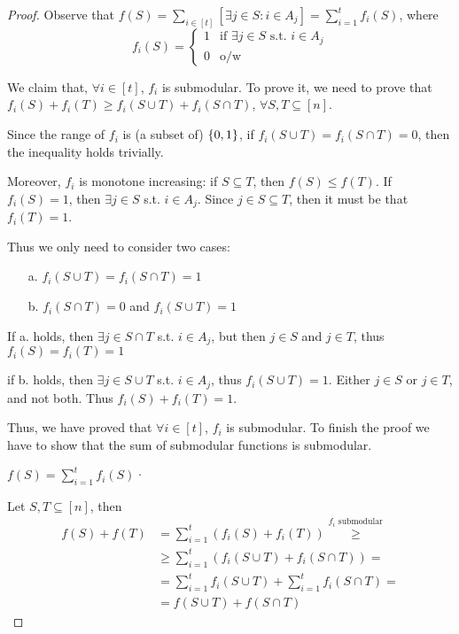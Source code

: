     \begin{proof}
        Observe that $f(S) = \sum_{i \in [t]} [\exists j \in S : i \in A_j] = \sum_{i=1}^{t} f_i(S)$, where
        \begin{equation}
            f_i(S) =
            \begin{cases}
                1 & \text{if } \exists j \in S \text{ s.t. } i \in A_j\\
                0 & \text{o/w}
            \end{cases}
        \end{equation}

        We claim that, $\forall i \in [t]$, $f_i$ is submodular.
        To prove it, we need to prove that $f_i(S) + f_i(T) \geq f_i(S \cup T) + f_i(S \cap T)$, $\forall S,T \subseteq [n]$.

        Since the range of $f_i$ is (a subset of) $\{ 0,1 \}$, if $f_i(S \cup T) = f_i(S \cap T) = 0$, then the inequality holds trivially.

        Moreover, $f_i$ is monotone increasing: if $S \subseteq T$, then $f(S) \leq f(T)$.
        If $f_i(S) = 1$, then $\exists j \in S$ s.t. $i \in A_j$. Since $j \in S \subseteq T$, then it must be that $f_i(T) = 1$.

        Thus we only need to consider two cases:
        \begin{itemize}
            \item[a.] $f_i(S \cup T) = f_i(S \cap T) = 1$
            \item[b.] $f_i(S \cap T) = 0$ and $f_i(S \cup T) = 1$
        \end{itemize}

        If a. holds, then $\exists j \in S \cap T$ s.t. $i \in A_j$, but then $j \in S$ and $j \in T$, thus $f_i(S) = f_i(T) = 1$

        if b. holds, then $\exists j \in S \cup T$ s.t. $i \in A_j$, thus $f_i(S \cup T) = 1$. Either $j \in S$ or $j \in T$, and not both. Thus $f_i(S) + f_i(T) = 1$.

        Thus, we have proved that $\forall i \in [t]$, $f_i$ is submodular.
        To finish the proof we have to show that the sum of submodular functions is submodular.

        $f(S) = \sum_{i=1}^{t} f_i(S)$·

        Let $S,T \subseteq [n]$, then
        \begin{equation*}
            \begin{split}
                f(S) + f(T) &= \sum_{i=1}^{t} (f_i(S) + f_i(T)) \overset{f_i \text{ submodular}}{\geq}\\
                    &\geq \sum_{i=1}^{t}(f_i(S \cup T) + f_i(S \cap T)) =\\
                    &= \sum_{i=1}^{t} f_i(S \cup T) + \sum_{i=1}^{t} f_i (S \cap T) =\\
                    &= f(S \cup T) + f(S \cap T)
            \end{split}
        \end{equation*}
    \end{proof}

